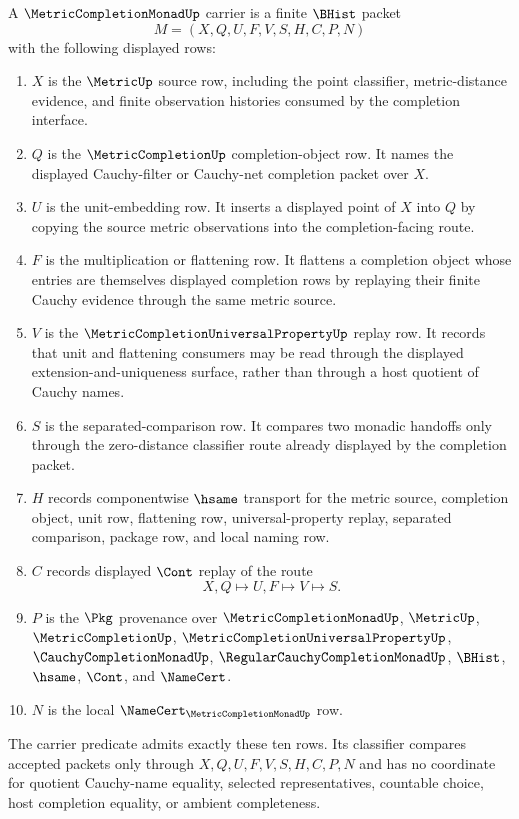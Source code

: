 \begin{definition}
\label{def:metric-completion-monad-carrier}
A $\MetricCompletionMonadUp$ carrier is a finite $\BHist$ packet
$$
M=(X,Q,U,F,V,S,H,C,P,N)
$$
with the following displayed rows:
\begin{enumerate}
\item $X$ is the $\MetricUp$ source row, including the point classifier, metric-distance evidence, and finite observation histories consumed by the completion interface.
\item $Q$ is the $\MetricCompletionUp$ completion-object row. It names the displayed Cauchy-filter or Cauchy-net completion packet over $X$.
\item $U$ is the unit-embedding row. It inserts a displayed point of $X$ into $Q$ by copying the source metric observations into the completion-facing route.
\item $F$ is the multiplication or flattening row. It flattens a completion object whose entries are themselves displayed completion rows by replaying their finite Cauchy evidence through the same metric source.
\item $V$ is the $\MetricCompletionUniversalPropertyUp$ replay row. It records that unit and flattening consumers may be read through the displayed extension-and-uniqueness surface, rather than through a host quotient of Cauchy names.
\item $S$ is the separated-comparison row. It compares two monadic handoffs only through the zero-distance classifier route already displayed by the completion packet.
\item $H$ records componentwise $\hsame$ transport for the metric source, completion object, unit row, flattening row, universal-property replay, separated comparison, package row, and local naming row.
\item $C$ records displayed $\Cont$ replay of the route
$$
X,Q \longmapsto U,F \longmapsto V \longmapsto S .
$$
\item $P$ is the $\Pkg$ provenance over $\MetricCompletionMonadUp$, $\MetricUp$, $\MetricCompletionUp$, $\MetricCompletionUniversalPropertyUp$, $\CauchyCompletionMonadUp$, $\RegularCauchyCompletionMonadUp$, $\BHist$, $\hsame$, $\Cont$, and $\NameCert$.
\item $N$ is the local $\NameCert_{\MetricCompletionMonadUp}$ row.
\end{enumerate}
The carrier predicate admits exactly these ten rows. Its classifier compares accepted packets only through $X,Q,U,F,V,S,H,C,P,N$ and has no coordinate for quotient Cauchy-name equality, selected representatives, countable choice, host completion equality, or ambient completeness.
\end{definition}

